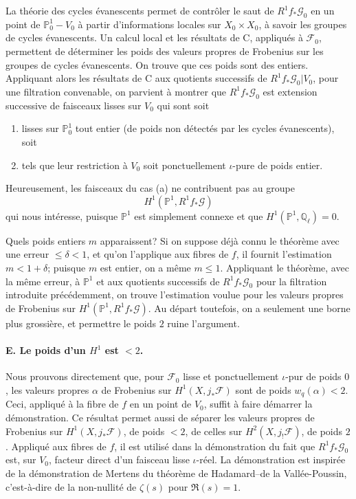 \documentclass[11pt]{article}
\theoremstyle{remark}
\newcommand{\Ql}{\mathbb{Q}_\ell}
\begin{document}
La théorie des cycles évanescents permet de contrôler le saut de $R^1f_*\mathcal G_0$ en un point de $\mathbb P^1_0-V_0$ à partir d'informations locales sur $X_0\times X_0$, à savoir les groupes de cycles évanescents. Un calcul local et les résultats de C, appliqués à $\mathcal F_0$, permettent de déterminer les poids des valeurs propres de Frobenius sur les groupes de cycles évanescents. On trouve que ces poids sont des entiers. Appliquant alors les résultats de C aux quotients successifs de $R^1f_*\mathcal G_0|V_0$, pour une filtration convenable, on parvient à montrer que $R^1f_*\mathcal G_0$ est extension successive de faisceaux lisses sur $V_0$ qui sont soit
\begin{enumerate}[label=(\alph*)]
\item lisses sur $\mathbb P^1_0$ tout entier (de poids non détectés par les cycles évanescents), soit
\item tels que leur restriction à $V_0$ soit ponctuellement $\iota$-pure de poids entier.
\end{enumerate}
Heureusement, les faisceaux du cas (a) ne contribuent pas au groupe
\[
H^1(\mathbb P^1,R^1f_*\mathcal G)
\]
qui nous intéresse, puisque $\mathbb P^1$ est simplement connexe et que $H^1(\mathbb P^1,\Ql)=0$.

Quels poids entiers $m$ apparaissent? Si on suppose déjà connu le théorème avec une erreur $\le \delta<1$, et qu'on l'applique aux fibres de $f$, il fournit l'estimation $m<1+\delta$; puisque $m$ est entier, on a même $m\le 1$. Appliquant le théorème, avec la même erreur, à $\mathbb P^1$ et aux quotients successifs de $R^1f_*\mathcal G_0$ pour la filtration introduite précédemment, on trouve l'estimation voulue pour les valeurs propres de Frobenius sur $H^1(\mathbb P^1,R^1f_*\mathcal G)$. Au départ toutefois, on a seulement une borne plus grossière, et permettre le poids $2$ ruine l'argument.

\paragraph{E. Le poids d'un $H^1$ est $<2$.}
Nous prouvons directement que, pour $\mathcal F_0$ lisse et ponctuellement $\iota$-pur de poids $0$, les valeurs propres $\alpha$ de Frobenius sur $H^1(X,j_*\mathcal F)$ sont de poids $w_q(\alpha)<2$. Ceci, appliqué à la fibre de $f$ en un point de $V_0$, suffit à faire démarrer la démonstration. Ce résultat permet aussi de séparer les valeurs propres de Frobenius sur $H^1(X,j_*\mathcal F)$, de poids $<2$, de celles sur $H^2(X,j_!\mathcal F)$, de poids $2$. Appliqué aux fibres de $f$, il est utilisé dans la démonstration du fait que $R^1f_*\mathcal G_0$ est, sur $V_0$, facteur direct d'un faisceau lisse $\iota$-réel. La démonstration est inspirée de la démonstration de Mertens du théorème de Hadamard--de la Vallée-Poussin, c'est-à-dire de la non-nullité de $\zeta(s)$ pour $\Re(s)=1$.
\end{document}

